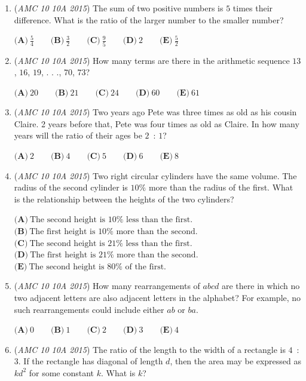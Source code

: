 \begin{enumerate}
 $\textbf{(A)}\ 81\qquad\textbf{(B)}\ 85\qquad\textbf{(C)}\ 91\qquad\textbf{(D)}\ 94\qquad\textbf{(E)}\ 95$


	\item (\textit{AMC 10 10A 2015}) The sum of two positive numbers is $5$ times their difference. What is the ratio of the larger number to the smaller number?


 $\textbf{(A)}\ \frac{5}{4}\qquad\textbf{(B)}\ \frac{3}{2}\qquad\textbf{(C)}\ \frac{9}{5}\qquad\textbf{(D)}\ 2 \qquad\textbf{(E)}\ \frac{5}{2}$


	\item (\textit{AMC 10 10A 2015}) How many terms are there in the arithmetic sequence $13$, $16$, $19$, . . ., $70$, $73$?


 $\textbf{(A)}\ 20\qquad\textbf{(B)}\ 21\qquad\textbf{(C)}\ 24\qquad\textbf{(D)}\ 60\qquad\textbf{(E)}\ 61$


	\item (\textit{AMC 10 10A 2015}) Two years ago Pete was three times as old as his cousin Claire. 2 years before that, Pete was four times as old as Claire. In how many years will the ratio of their ages be $2$ : $1$?


 $\textbf{(A)}\ 2\qquad\textbf{(B)}\ 4\qquad\textbf{(C)}\ 5\qquad\textbf{(D)}\ 6\qquad\textbf{(E)}\ 8$


	\item (\textit{AMC 10 10A 2015}) Two right circular cylinders have the same volume. The radius of the second cylinder is $10\%$ more than the radius of the first. What is the relationship between the heights of the two cylinders?


 $\textbf{(A)}\  \text{The second height is } 10\% \text{ less than the first.}$
$\textbf{(B)}\  \text{The first height is } 10\% \text{ more than the second.}$
$\textbf{(C)}\ \text{The second height is } 21\% \text{ less than the first.}$
$\textbf{(D)}\ \text{The first height is } 21\% \text{ more than the second.}$
$\textbf{(E)}\ \text{The second height is } 80\% \text{ of the first.}$


	\item (\textit{AMC 10 10A 2015}) How many rearrangements of $abcd$ are there in which no two adjacent letters are also adjacent letters in the alphabet?  For example, no such rearrangements could include either $ab$ or $ba$.


 $\textbf{(A)}\ 0\qquad\textbf{(B)}\ 1\qquad\textbf{(C)}\ 2\qquad\textbf{(D)}\ 3\qquad\textbf{(E)}\ 4$


	\item (\textit{AMC 10 10A 2015}) The ratio of the length to the width of a rectangle is $4$ : $3$. If the rectangle has diagonal of length $d$, then the area may be expressed as $kd^2$ for some constant $k$. What is $k$?



\end{enumerate}
